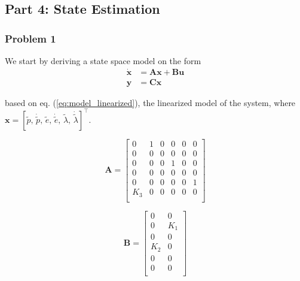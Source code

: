 \subsection{Part 4: State Estimation}




\subsubsection{Problem 1}

We start by deriving a state space model on the form 
\begin{align}
    \bm{\dot{x}} &= \bm{A}\bm{x} + \bm{B}\bm{u}\\
    \bm{y} &= \bm{C}\bm{x}
\end{align}

based on eq. (\ref{eq:model_linearized}), the linearized model of the system, where $\bm{x} = [\tilde{p}, \, \dot{\tilde{p}}, \, \tilde{e}, \, \dot{\tilde{e}}, \, \tilde{\lambda}, \, \dot{\tilde{\lambda}}]^\top$.

\begin{equation} \label{eq:part4_prob1_A}
    \bm{A} = 
	\begin{bmatrix}
		0   & 1   & 0   & 0   & 0   & 0 \\
		0   & 0   & 0   & 0   & 0   & 0 \\
		0   & 0   & 0   & 1   & 0   & 0 \\
		0   & 0   & 0   & 0   & 0   & 0 \\
		0   & 0   & 0   & 0   & 0   & 1 \\
		K_3 & 0   & 0   & 0   & 0   & 0 \\
	\end{bmatrix}
\end{equation} 


\begin{equation} \label{eq:part4_prob1_B}
    \bm{B} = 
	\begin{bmatrix}
		0   & 0   \\
		0   & K_1 \\
		0   & 0   \\
		K_2 & 0   \\
		0   & 0   \\
		0   & 0   \\
	\end{bmatrix}
\end{equation} 

